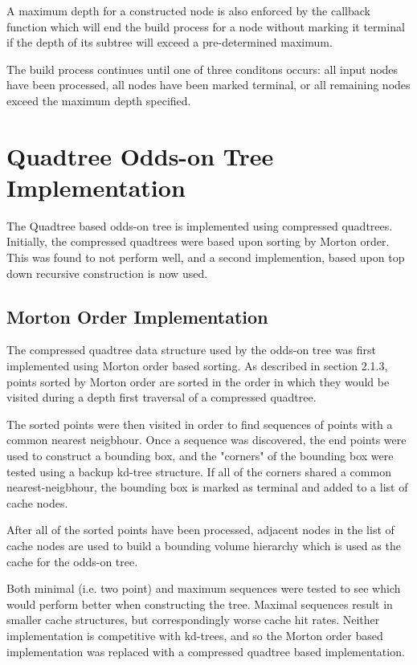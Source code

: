 \documentclass[mcs]{scsthesis}
\begin{document}
A maximum depth for a constructed node is also enforced by the callback
function which will end the build process for a node without marking it
terminal if the depth of its subtree will exceed a pre-determined maximum.

The build process continues until one of three conditons occurs: all input nodes
have been processed, all nodes have been marked terminal, or all remaining nodes
exceed the maximum depth specified.

\section{Quadtree Odds-on Tree Implementation}

The Quadtree based odds-on tree is implemented using compressed quadtrees.
Initially, the compressed quadtrees were based upon sorting by Morton order.
This was found to not perform well, and a second implemention, based upon top
down recursive construction is now used.

\subsection{Morton Order Implementation}

The compressed quadtree data structure used by the odds-on tree was first
implemented using Morton order based sorting. As described in section 2.1.3,
points sorted by Morton order are sorted in the order in which they would be
visited during a depth first traversal of a compressed quadtree.

The sorted points were then visited in order to find sequences of points with
a common nearest neigbhour. Once a sequence was discovered, the end points
were used to construct a bounding box, and the "corners" of the bounding box
were tested using a backup kd-tree structure. If all of the corners shared a
common nearest-neigbhour, the bounding box is marked as terminal and added to
a list of cache nodes.

After all of the sorted points have been processed, adjacent nodes in the list
of cache nodes are used to build a bounding volume hierarchy which is used as
the cache for the odds-on tree.

Both minimal (i.e. two point) and maximum sequences were tested to see which
would perform better when constructing the tree. Maximal sequences result in
smaller cache structures, but correspondingly worse cache hit rates. Neither
implementation is competitive with kd-trees, and so the Morton order based
implementation was replaced with a compressed quadtree based implementation.
\end{document}
